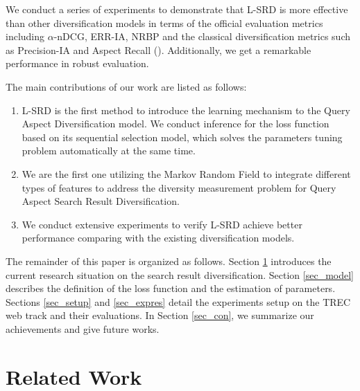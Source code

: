 \documentclass[review]{elsarticle}
\begin{document}
We conduct a series of experiments to demonstrate that L-SRD is more effective than other diversification models in terms of the official evaluation metrics including $\alpha$-nDCG, ERR-IA, NRBP  and the classical diversification metrics such as Precision-IA and Aspect Recall (\cite{clarke2008novelty,chapelle2009expected,clarke2009effectiveness}). Additionally, we get a remarkable performance in robust evaluation.

The main contributions of our work are listed as follows:
\begin{enumerate}
	\item L-SRD is the first method to introduce the learning mechanism to the Query Aspect Diversification model. We conduct inference for the loss function based on its sequential selection model, which solves the parameters tuning problem automatically at the same time.
	\item We are the first one utilizing the Markov Random Field to integrate different types of features to address the diversity measurement problem for Query Aspect Search Result Diversification.
	\item We conduct extensive experiments to verify L-SRD achieve better performance comparing with the existing diversification models.
\end{enumerate}

The remainder of this paper is organized as follows. Section \ref{sec_rel} introduces the current research situation on the search result diversification. Section \ref{sec_model} describes the definition of the loss function and the estimation of parameters. Sections \ref{sec_setup} and \ref{sec_expres} detail the experiments setup on the TREC web track and their evaluations. In Section \ref{sec_con}, we summarize our achievements and give future works.

\section{Related Work}\label{sec_rel}
\end{document}
